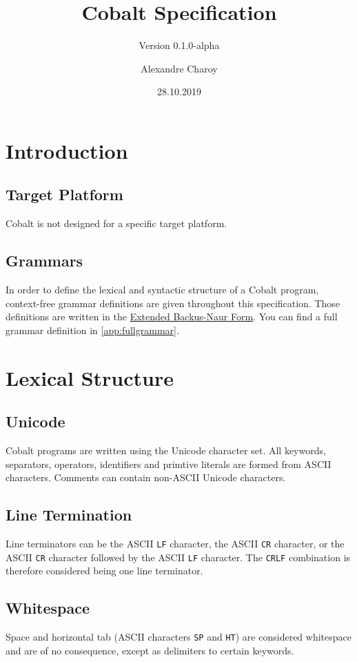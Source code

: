 \documentclass[a4paper,appendixprefix]{scrreprt}
\title{Cobalt Specification}
\subtitle{Version 0.1.0-alpha}
\author{Alexandre Charoy}
\date{28.10.2019}
\begin{document}
\maketitle

\chapter{Introduction}

\section{Target Platform}
Cobalt is not designed for a specific target platform.

\section{Grammars}
In order to define the lexical and syntactic structure of a Cobalt program, context-free grammar definitions are given throughout this specification. Those definitions are written in the \href{https://en.wikipedia.org/wiki/Extended_Backus-Naur_form}{Extended Backus-Naur Form}. You can find a full grammar definition in \ref{app:fullgrammar}.

\chapter{Lexical Structure}

\section{Unicode}
Cobalt programs are written using the Unicode character set. All keywords, separators, operators, identifiers and primtive literals are formed from ASCII characters. Comments can contain non-ASCII Unicode characters.

\section{Line Termination}\label{line_termination}
Line terminators can be the ASCII \verb!LF! character, the ASCII \verb!CR! character, or the ASCII \verb!CR! character followed by the ASCII \verb!LF! character. The \verb!CRLF! combination is therefore considered being one line terminator.

\section{Whitespace}
Space and horizontal tab (ASCII characters \verb!SP! and \verb!HT!) are considered whitespace and are of no consequence, except as delimiters to certain keywords.
\end{document}
